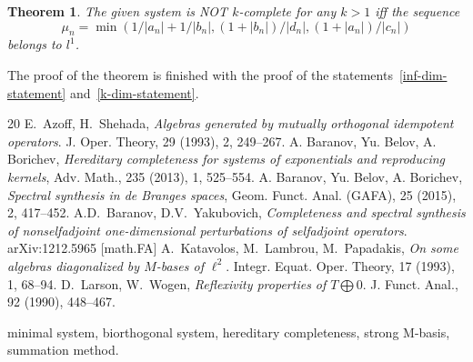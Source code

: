 \documentclass[12pt]{article}
\newtheorem{theorem}{Theorem}
\theoremstyle{definition}
\numberwithin{remark}{section}
\numberwithin{theorem}{section}
\numberwithin{prop}{section}
\numberwithin{equation}{section}
\numberwithin{lemma}{section}
\numberwithin{prop_under_lemma}{lemma}
\begin{document}
    \begin{theorem}
        The given system is NOT $k$-complete for any $k > 1$ iff the sequence
        $$
            \mu_n = \min(1/|a_n| + 1/|b_n|, (1 + |b_n|)/|d_n|, (1 + |a_n|)/|c_n|)
        $$ belongs to $l^1$.
    \end{theorem}
        The proof of the theorem is finished with the proof of the statements~\ref{inf-dim-statement} and~\ref{k-dim-statement}.
\medskip
\bigskip
\begin {thebibliography}{20}
    E.~\!Azoff, H.~\!Shehada,
    \emph{Algebras generated by mutually orthogonal idempotent operators}.
    J. Oper. Theory, 29 (1993), 2, 249--267.
    A. Baranov, Yu. Belov, A. Borichev,
    \emph{Hereditary completeness for systems of exponentials and reproducing kernels},
    Adv. Math., 235 (2013), 1, 525--554.
    A. Baranov, Yu. Belov, A. Borichev, 
    \emph{Spectral synthesis in de Branges spaces},
    Geom. Funct. Anal. (GAFA), 25 (2015), 2, 417--452.
    A.D.~\!Baranov, D.V.~\!Yakubovich,
    \emph{Completeness and spectral synthesis of nonselfadjoint one-dimensional
    perturbations of selfadjoint operators}.
    arXiv:1212.5965 [math.FA]
    A.~\!Katavolos, M.~\!Lambrou, M.~\!Papadakis,
    \emph{On some algebras diagonalized by $M$-bases of $\ell^2$}.
    Integr. Equat. Oper. Theory, 17 (1993), 1, 68--94.
    D.~\!Larson, W.~\!Wogen,
    \emph{Reflexivity properties of $T\bigoplus0$}.
    J. Funct. Anal., 92 (1990), 448--467.

\end{thebibliography}
\vspace{1em}
 minimal system, biorthogonal system, hereditary completeness, strong M-basis, summation method.
\end{document}
